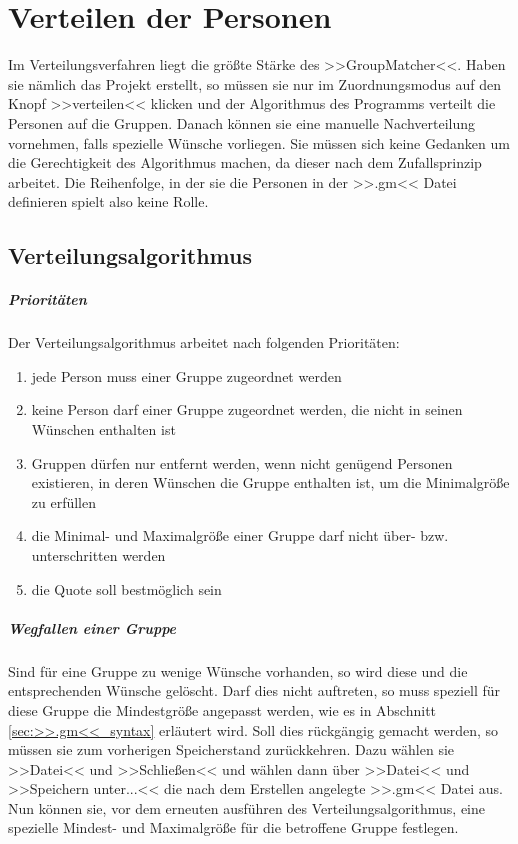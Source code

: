 \chapter{Verteilen der Personen}
\label{ch:verteilen_der_personen}

Im Verteilungsverfahren liegt die größte Stärke des >>GroupMatcher<<. Haben sie nämlich das Projekt erstellt, so müssen sie nur im Zuordnungsmodus auf den Knopf >>verteilen<<  klicken und der Algorithmus des Programms verteilt die Personen auf die Gruppen. Danach können sie eine manuelle Nachverteilung vornehmen, falls spezielle Wünsche vorliegen. Sie müssen sich keine Gedanken um die Gerechtigkeit des Algorithmus machen, da dieser nach dem Zufallsprinzip arbeitet. Die Reihenfolge, in der sie die Personen in der >>.gm<< Datei definieren spielt also keine Rolle.

\section{Verteilungsalgorithmus}
\label{sec:verteilungsalgorithmus}

\paragraph{Prioritäten} Der Verteilungsalgorithmus arbeitet nach folgenden Prioritäten:
\begin{enumerate}
	\item jede Person muss einer Gruppe zugeordnet werden
	\item keine Person darf einer Gruppe zugeordnet werden, die nicht in seinen Wünschen enthalten ist
	\item Gruppen dürfen nur entfernt werden, wenn nicht genügend Personen existieren, in deren Wünschen die Gruppe enthalten ist, um die Minimalgröße zu erfüllen
	\item die Minimal- und Maximalgröße einer Gruppe darf nicht über- bzw. unterschritten werden
	\item die Quote  soll bestmöglich sein
\end{enumerate}

\paragraph{Wegfallen einer Gruppe} Sind für eine Gruppe zu wenige Wünsche vorhanden, so wird diese und die entsprechenden Wünsche gelöscht. Darf dies nicht auftreten, so muss speziell für diese Gruppe die Mindestgröße angepasst werden, wie es in Abschnitt \ref{sec:>>.gm<<_syntax} erläutert wird. Soll dies rückgängig gemacht werden, so müssen sie zum vorherigen Speicherstand zurückkehren. Dazu wählen sie >>Datei<< und >>Schließen<< und wählen dann über >>Datei<< und >>Speichern unter...<< die nach dem Erstellen angelegte >>.gm<< Datei aus. Nun können sie, vor dem erneuten ausführen des Verteilungsalgorithmus, eine spezielle Mindest- und Maximalgröße für die betroffene Gruppe festlegen.

